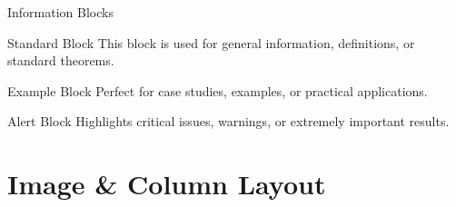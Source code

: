 \documentclass[aspectratio=169]{beamer}
\begin{document}
\begin{frame}{Information Blocks}
    \begin{block}{Standard Block}
        This block is used for general information, definitions, or standard theorems. 
    \end{block}
    
    \begin{exampleblock}{Example Block}
        Perfect for case studies, examples, or practical applications.
    \end{exampleblock}
    
    \begin{alertblock}{Alert Block}
        Highlights critical issues, warnings, or extremely important results.
    \end{alertblock}
\end{frame}

\section{Image \& Column Layout}
\end{document}
